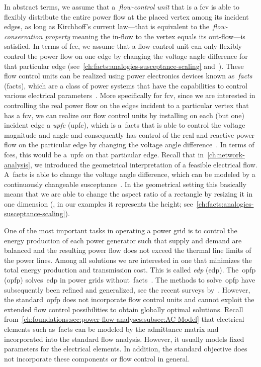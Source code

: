 In abstract terms, we assume that a~\emph{flow-control unit} that is a
\gls{fcv} is able to flexibly distribute the entire power flow at the
placed vertex among its incident edges, as long as Kirchhoff's current
law---that is equivalent to the~\emph{flow-conservation property} meaning the
in-flow to the vertex equals its out-flow---is satisfied. In terms of
\gls{fce}, we assume that a flow-control unit can only flexibly control the
power flow on one edge by changing the voltage angle difference for that
particular edge (see~\cref{ch:facts:analogies-susceptance-scaling}
and~). These flow control units can be realized using power
electronics devices known as~\emph{\acrlong{facts}} (\gls{facts}), which
are a class of power systems that have the capabilities to control various
electrical parameters~\parencite{206621,gh-ufact-00}. More specifically for
\gls{fcv}, since we are interested in controlling the real power flow on
the edges incident to a particular vertex that has a \gls{fcv}, we can realize
our flow control units by installing on each (but one) incident edge a
\emph{\acrlong{upfc}} (\gls{upfc}), which is a~\gls{facts} that is able to
control the voltage magnitude and angle and consequently has control of the real
and reactive power flow on the particular edge by changing the voltage angle
difference~\parencite{Nor97,gh-ufact-00}. In terms of \gls{fce}s, this would be
a~\gls{upfc} on that particular edge. Recall that in~\cref{ch:network-analysis},
we introduced the geometrical interpretation of a feasible electrical flow.
A~\gls{facts} is able to change the voltage angle difference, which can be
modeled by a continuously changeable susceptance~. In the
geometrical setting this basically means that we are able to change the aspect
ratio of a rectangle by resizing it in one dimension (\eg, in our examples it
represents the height; see~\cref{ch:facts:analogies-susceptance-scaling}).

One of the most important tasks in operating a power grid is to control the
energy production of each power generator such that supply and demand are
balanced and the resulting power flow does not exceed the thermal line limits of
the power lines. Among all solutions we are interested in one that minimizes the
total energy production and transmission cost. This is called
\emph{\acrlong{edp}} (\gls{edp}). The~\acrlong{opfp} (\gls{opfp})
solves~\gls{edp} in power grids without~\gls{facts}~\parencite{Car62}. The
methods to solve~\gls{opfp} have subsequently been refined and generalized, see
the recent surveys by~\textcite{SurveyOPF1,SurveyOPF2}. However, the
standard~\gls{opfp} does not incorporate flow control units and cannot exploit
the extended flow control possibilities to obtain globally optimal solutions.
Recall from~\cref{ch:foundations:sec:power-flow-analyses:subsec:AC-Model} that
electrical elements such as~\gls{facts} can be modeled by the admittance matrix
and incorporated into the standard flow analysis. However, it usually models
fixed parameters for the electrical elements. In addition, the standard
objective does not incorporate these components or flow control in general.

